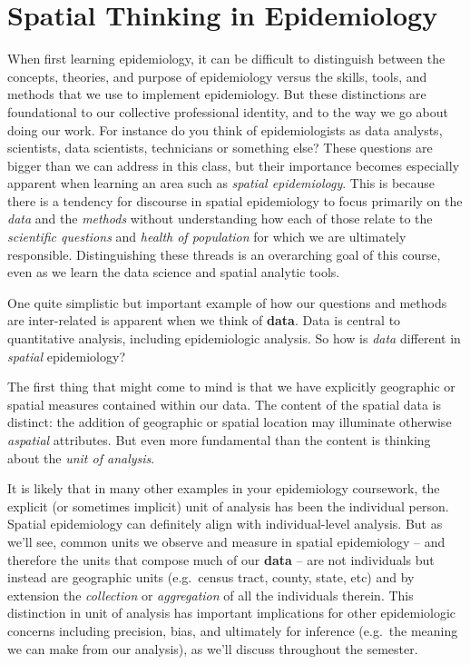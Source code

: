 \documentclass[
]{book}
\begin{document}
\hypertarget{spatial-thinking-in-epidemiology}{%
\section{Spatial Thinking in Epidemiology}\label{spatial-thinking-in-epidemiology}}

When first learning epidemiology, it can be difficult to distinguish between the concepts, theories, and purpose of epidemiology versus the skills, tools, and methods that we use to implement epidemiology. But these distinctions are foundational to our collective professional identity, and to the way we go about doing our work. For instance do you think of epidemiologists as data analysts, scientists, data scientists, technicians or something else? These questions are bigger than we can address in this class, but their importance becomes especially apparent when learning an area such as \emph{spatial epidemiology}. This is because there is a tendency for discourse in spatial epidemiology to focus primarily on the \emph{data} and the \emph{methods} without understanding how each of those relate to the \emph{scientific questions} and \emph{health of population} for which we are ultimately responsible. Distinguishing these threads is an overarching goal of this course, even as we learn the data science and spatial analytic tools.

One quite simplistic but important example of how our questions and methods are inter-related is apparent when we think of \textbf{data}. Data is central to quantitative analysis, including epidemiologic analysis. So how is \emph{data} different in \emph{spatial} epidemiology?

The first thing that might come to mind is that we have explicitly geographic or spatial measures contained within our data. The content of the spatial data is distinct: the addition of geographic or spatial location may illuminate otherwise \emph{aspatial} attributes. But even more fundamental than the content is thinking about the \emph{unit of analysis}.

It is likely that in many other examples in your epidemiology coursework, the explicit (or sometimes implicit) unit of analysis has been the individual person. Spatial epidemiology can definitely align with individual-level analysis. But as we'll see, common units we observe and measure in spatial epidemiology -- and therefore the units that compose much of our \textbf{data} -- are not individuals but instead are geographic units (e.g.~census tract, county, state, etc) and by extension the \emph{collection} or \emph{aggregation} of all the individuals therein. This distinction in unit of analysis has important implications for other epidemiologic concerns including precision, bias, and ultimately for inference (e.g.~the meaning we can make from our analysis), as we'll discuss throughout the semester.
\end{document}
